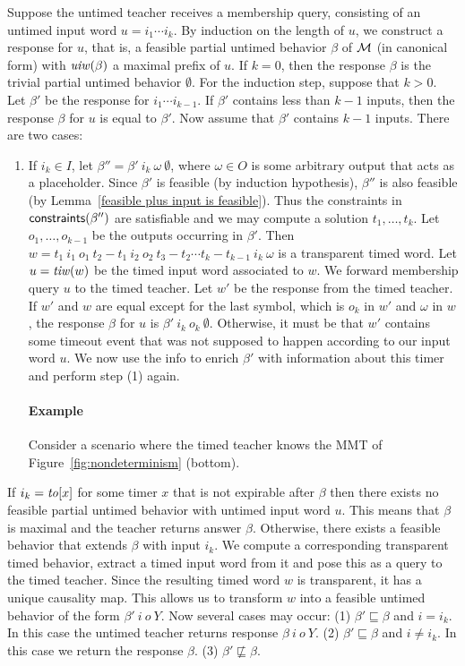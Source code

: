 Suppose the untimed teacher receives a membership query, consisting of an untimed input word
$u = i_1 \cdots i_k$.
By induction on the length of $u$, 
we construct a response for $u$, that is, a feasible partial untimed behavior $\beta$ of ${\mathcal M}$ (in canonical form)
with $\mathit{uiw}(\beta)$ a maximal prefix of $u$.
If $k=0$, then the response $\beta$ is the trivial partial untimed behavior $\emptyset$.
For the induction step, suppose that $k>0$.
Let $\beta'$ be the response for $i_1 \cdots i_{k-1}$.
If $\beta'$ contains less than $k-1$ inputs, then the response $\beta$ for $u$ is equal to $\beta'$.
Now assume that $\beta'$ contains $k-1$ inputs. There are two cases:
\begin{enumerate}
\item
If $i_k \in I$, let $\beta'' = \beta' ~ i_k ~ \omega ~ \emptyset$, where $\omega \in O$ is some arbitrary output that acts as a placeholder.
Since $\beta'$ is feasible (by induction hypothesis), $\beta''$ is also feasible 
(by Lemma~\ref{feasible plus input is feasible}).
Thus the constraints in $\mathsf{constraints}({\beta''})$ are satisfiable and we may compute a solution $t_1 ,\ldots, t_k$.
Let $o_1 ,\ldots, o_{k-1}$ be the outputs occurring in $\beta'$. Then
$w = t_1 ~ i_1 ~ o_1 ~ t_2 - t_1 ~ i_2 ~ o_2 ~ t_3- t_2 \cdots t_k - t_{k-1} ~ i_k ~ \omega$ is a transparent timed word.
Let $u = \mathit{tiw}(w)$ be the timed input word associated to $w$.
We forward membership query $u$ to the timed teacher.
Let $w'$ be the response from the timed teacher.
If $w'$ and $w$ are equal except for the last symbol, which is $o_k$ in $w'$ and $\omega$ in $w$,
the response $\beta$ for $u$ is $\beta' ~ i_k ~ o_k ~ \emptyset$.
Otherwise, it must be that $w'$ contains some timeout event that was not supposed to happen according to our input word $u$.
We now use the info to enrich $\beta'$ with information about this timer and perform step (1) again.

\paragraph{Example}
Consider a scenario where the timed teacher knows the MMT of Figure~\ref{fig:nondeterminism} (bottom).
\end{enumerate}
If $i_k = \mathit{to}[x]$ for some timer $x$ that is not expirable after $\beta$ then there exists no feasible partial untimed behavior
with untimed input word $u$. This means that $\beta$ is maximal and the teacher returns answer $\beta$.
Otherwise, there exists a feasible behavior that extends $\beta$ with input $i_k$. 
We compute
a corresponding transparent timed behavior, extract a timed input word from it and pose this as a query to the timed teacher.
Since the resulting timed word $w$ is transparent, it has a unique causality map.
This allows us to transform $w$ into a feasible untimed behavior of the form $\beta' ~ i ~ o ~ Y$.
Now several cases may occur:
(1) $\beta' \sqsubseteq \beta$ and $i = i_k$. In this case the untimed teacher returns response $\beta ~ i ~ o ~ Y$.
(2) $\beta' \sqsubseteq \beta$ and $i \neq i_k$. In this case we return the response $\beta$.
(3) $\beta' \not\sqsubseteq \beta$.


